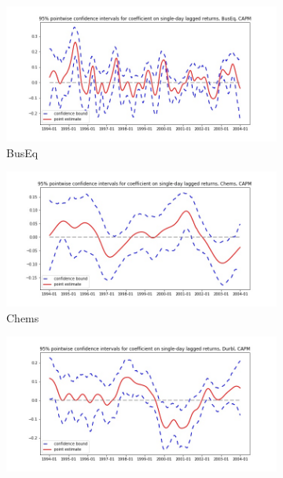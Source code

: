 \documentclass{article}
\begin{document}
\begin{figure}
  \begin{subfigure}[b]{0.5\textwidth}
    \centering
    \includegraphics[width=\textwidth]{BusEq/pointwiseCIs_CAPM.jpg}
    \caption{BusEq}
    \label{fig:1}
  \end{subfigure}
  \begin{subfigure}[b]{0.5\textwidth}
    \centering
    \includegraphics[width=\textwidth]{Chems/pointwiseCIs_CAPM.jpg}
    \caption{Chems}
    \label{fig:2}
  \end{subfigure}
  \begin{subfigure}[b]{0.5\textwidth}
    \centering
    \includegraphics[width=\textwidth]{Durbl/pointwiseCIs_CAPM.jpg}

\end{subfigure}
\end{figure}
\end{document}
